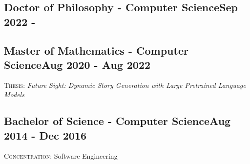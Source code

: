 \vspace*{10pt}
\subsection {{Doctor of Philosophy - Computer Science}\hfill Sep 2022 - }
\vspace*{5pt}

\vspace*{10pt}
\subsection {{Master of Mathematics - Computer Science}\hfill Aug 2020 - Aug 2022}
\vspace*{5pt}
\textsc{Thesis:} \textit{Future Sight: Dynamic Story Generation with Large Pretrained Language Models}
\vspace*{5pt}\\

\vspace*{6pt}
\subsection{{Bachelor of Science - Computer Science}\hfill Aug 2014 - Dec 2016}
\vspace*{5pt}
\textsc{Concentration:} Software Engineering
